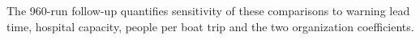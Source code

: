 The 960-run follow-up quantifies sensitivity of these comparisons to warning lead time, hospital capacity, people per boat trip and the two organization coefficients.
